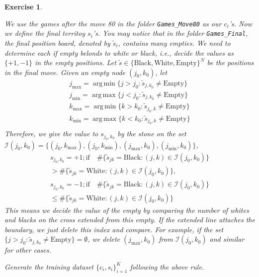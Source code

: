 \documentclass[12pt]{article}
\DeclareMathOperator*{\argmin}{arg\,min}
\DeclareMathOperator*{\argmax}{arg\,max}
\theoremstyle{colon}
\newtheorem{exercise}{Exercise}
\begin{document}
\begin{exercise}
\begin{enumerate}[label=\arabic*)]
      We use the games after the move 80 in the folder \texttt{Games\_Move80} as our $c_i$'s. Now we define the final territoy $s_i$'s. You may notice that in the folder \texttt{Games\_Final}, the final position board, denoted by $\tilde{s}_i$, contains many empties. We need to determine each if empty belonds to white or black, i.e., decide the values as $\{+1, -1\}$ in the empty positions. Let $\tilde{s} \in \{\text{Black}, \text{White}, \text{Empty}\}^N$ be the positions in the final move. Given an empty node $(j_0, k_0)$, let
      \begin{gather*}
        j_{\max} = \argmin \{j > j_0 : \tilde{s}_{j, k_0} \neq \text{Empty} \} \\
        j_{\min} = \argmax \{j < j_0 : \tilde{s}_{j, k_0} \neq \text{Empty} \} \\
        k_{\max} = \argmin \{k > k_0 : \tilde{s}_{j_0, k} \neq \text{Empty} \} \\
        k_{\min} = \argmax \{k < k_0 : \tilde{s}_{j_0, k} \neq \text{Empty} \} \\
      \end{gather*}
      Therefore, we give the value to $s_{j_0, k_0}$ by the stone on the set $\mathcal{I}(j_0,k_0) = \{(j_0, k_{\max}), (j_0, k_{\min}), (j_{\max}, k_0), (j_{\min}, k_0)\}$,
      \begin{gather*}
        s_{j_0, k_0} = +1; \text{if} \quad \# \{ \tilde{s}_{jk} = \text{Black} : (j,k) \in \mathcal{I}(j_0, k_0) \} \\
        > \# \{ \tilde{s}_{jk} = \text{White} : (j,k) \in \mathcal{I}(j_0, k_0) \}, \\
        s_{j_0, k_0} = -1; \text{if} \quad \# \{ \tilde{s}_{jk} = \text{Black} : (j,k) \in \mathcal{I}(j_0, k_0) \} \\
        \leq \# \{ \tilde{s}_{jk} = \text{White} : (j,k) \in \mathcal{I}(j_0, k_0) \}
      \end{gather*}
      This means we decide the value of the empty by comparing the number of whites and blacks on the cross extended from this empty. If the extended line attaches the boundary, we just delete this index and compare. For example, if the set $\{j > j_0 : \tilde{s}_{j, k_0} \neq \text{Empty} \} = \emptyset$, we delete $(j_{\max}, k_0)$ from $\mathcal{I}(j_0, k_0)$ and similar for other cases.

      Generate the training dataset $\{c_i, s_i\}_{i=1}^K$ following the above rule.


\end{enumerate}
\end{exercise}
\end{document}
